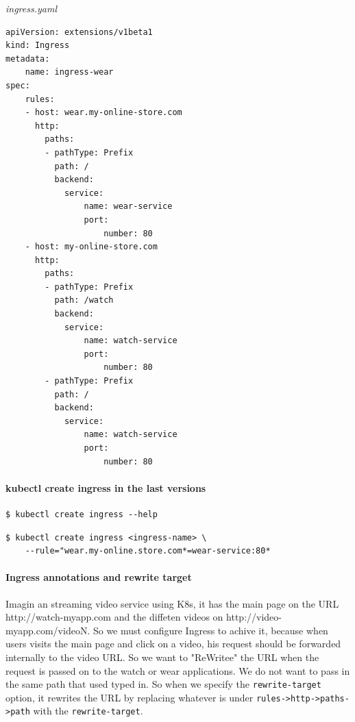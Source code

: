 \documentclass{article}
\newenvironment{codetemplate}[1][]{%
  \mybasecolorbox[#1]
  \itshape
}{%
  \endmybasecolorbox
}
\begin{document}
\begin{codetemplate}{ingress.yaml}
\begin{verbatim}
apiVersion: extensions/v1beta1
kind: Ingress
metadata:
    name: ingress-wear
spec:
    rules:
    - host: wear.my-online-store.com
      http:
        paths:
        - pathType: Prefix
          path: /
          backend:
            service:
                name: wear-service
                port:
                    number: 80
    - host: my-online-store.com
      http: 
        paths:
        - pathType: Prefix
          path: /watch
          backend:
            service:
                name: watch-service
                port:
                    number: 80
        - pathType: Prefix
          path: /
          backend:
            service:
                name: watch-service
                port:
                    number: 80
\end{verbatim}
\end{codetemplate}

\paragraph{kubectl create ingress in the last versions}

\begin{codetemplate}{}
\begin{verbatim}
$ kubectl create ingress --help
\end{verbatim}
\end{codetemplate}

\begin{codetemplate}{}
\begin{verbatim}
$ kubectl create ingress <ingress-name> \
    --rule="wear.my-online.store.com*=wear-service:80*
\end{verbatim}
\end{codetemplate}

\paragraph{Ingress annotations and rewrite target}

Imagin an streaming video service using K8s, it has the main page on the URL http://watch-myapp.com and the diffeten videos on http://video-myapp.com/videoN. So we must configure Ingress to achive it, because when users visits the main page and click on a video, his request should be forwarded internally to the video URL. So we want to "ReWritee" the URL when the request is passed on to the watch or wear applications. We do not want to pass in the same path that used typed in. So when we specify the \verb|rewrite-target| option, it rewrites the URL by replacing whatever is under \verb|rules->http->paths->path| with the \verb|rewrite-target|.
\end{document}
